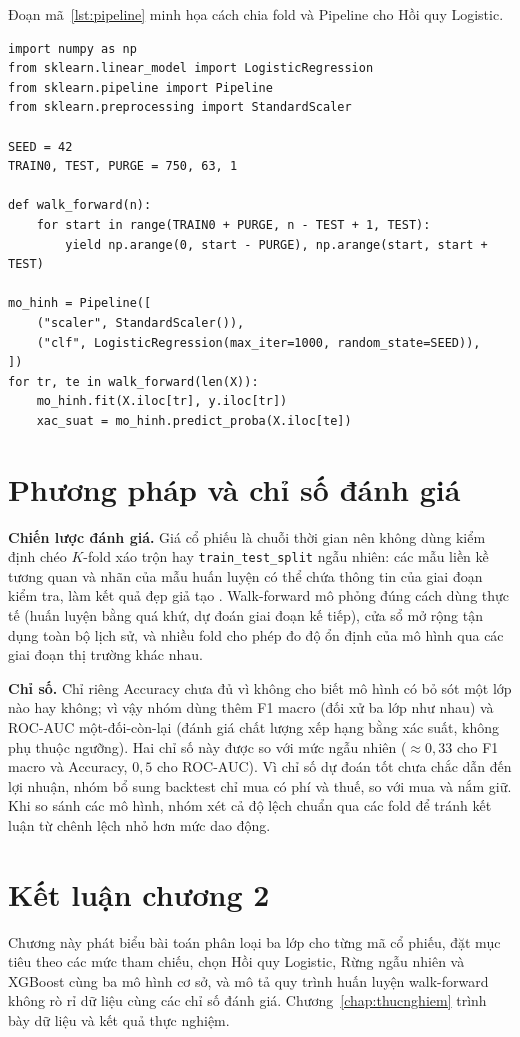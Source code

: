 \documentclass[12pt,a4paper,oneside]{report}
\begin{document}
Đoạn mã~\ref{lst:pipeline} minh họa cách chia fold và Pipeline cho Hồi quy Logistic.

\begin{lstlisting}[caption={Chia walk-forward và Pipeline (minh họa)},label={lst:pipeline}]
import numpy as np
from sklearn.linear_model import LogisticRegression
from sklearn.pipeline import Pipeline
from sklearn.preprocessing import StandardScaler

SEED = 42
TRAIN0, TEST, PURGE = 750, 63, 1

def walk_forward(n):
    for start in range(TRAIN0 + PURGE, n - TEST + 1, TEST):
        yield np.arange(0, start - PURGE), np.arange(start, start + TEST)

mo_hinh = Pipeline([
    ("scaler", StandardScaler()),
    ("clf", LogisticRegression(max_iter=1000, random_state=SEED)),
])
for tr, te in walk_forward(len(X)):
    mo_hinh.fit(X.iloc[tr], y.iloc[tr])
    xac_suat = mo_hinh.predict_proba(X.iloc[te])
\end{lstlisting}

\section{Phương pháp và chỉ số đánh giá}
\textbf{Chiến lược đánh giá.} Giá cổ phiếu là chuỗi thời gian nên không dùng
kiểm định chéo $K$-fold xáo trộn hay \texttt{train\_test\_split} ngẫu nhiên: các mẫu
liền kề tương quan và nhãn của mẫu huấn luyện có thể chứa thông tin của giai đoạn
kiểm tra, làm kết quả đẹp giả tạo \cite{bergmeir2012,lopezdeprado2018}. Walk-forward
mô phỏng đúng cách dùng thực tế (huấn luyện bằng quá khứ, dự đoán giai đoạn kế
tiếp), cửa sổ mở rộng tận dụng toàn bộ lịch sử, và nhiều fold cho phép đo độ ổn
định của mô hình qua các giai đoạn thị trường khác nhau.

\textbf{Chỉ số.} Chỉ riêng Accuracy chưa đủ vì không cho biết mô hình có bỏ sót
một lớp nào hay không; vì vậy nhóm dùng thêm F1 macro (đối xử ba lớp như nhau) và
ROC-AUC một-đối-còn-lại (đánh giá chất lượng xếp hạng bằng xác suất, không phụ
thuộc ngưỡng). Hai chỉ số này được so với mức ngẫu nhiên ($\approx 0{,}33$ cho F1
macro và Accuracy, $0{,}5$ cho ROC-AUC). Vì chỉ số dự đoán tốt chưa chắc dẫn đến lợi nhuận,
nhóm bổ sung backtest chỉ mua có phí và thuế, so với mua và nắm giữ. Khi so sánh
các mô hình, nhóm xét cả độ lệch chuẩn qua các fold để tránh kết luận từ chênh lệch
nhỏ hơn mức dao động.

\section{Kết luận chương 2}
Chương này phát biểu bài toán phân loại ba lớp cho từng mã cổ phiếu, đặt mục tiêu
theo các mức tham chiếu, chọn Hồi quy Logistic, Rừng ngẫu nhiên và XGBoost cùng ba
mô hình cơ sở, và mô tả quy trình huấn luyện walk-forward không rò rỉ dữ liệu cùng
các chỉ số đánh giá. Chương~\ref{chap:thucnghiem} trình bày dữ liệu và kết quả thực nghiệm.
\end{document}
